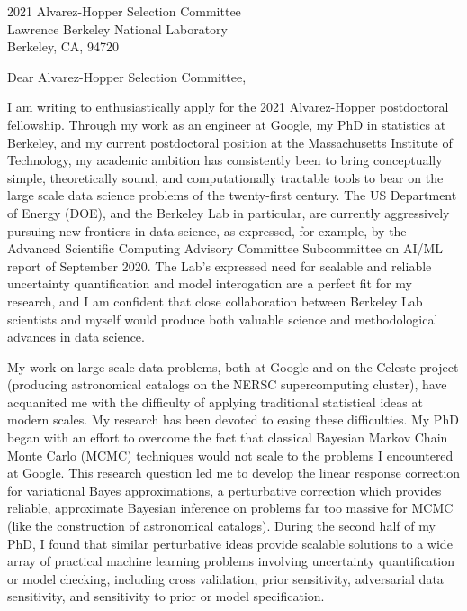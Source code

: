\documentclass{letter}
\begin{document}
\begin{letter}{2021 Alvarez-Hopper Selection Committee\\
Lawrence Berkeley National Laboratory\\
Berkeley, CA, 94720}


\opening{Dear Alvarez-Hopper Selection Committee,}

I am writing to enthusiastically apply for the 2021 Alvarez-Hopper postdoctoral
fellowship.  Through my work as an engineer at Google, my PhD in statistics at
Berkeley, and my current postdoctoral position at the Massachusetts Institute of
Technology, my academic ambition has consistently been to bring conceptually
simple, theoretically sound, and computationally tractable tools to bear on the
large scale data science problems of the twenty-first century.  The US
Department of Energy (DOE), and the Berkeley Lab in particular, are currently
aggressively pursuing new frontiers in data science, as expressed, for example,
by the Advanced Scientific Computing Advisory Committee Subcommittee on AI/ML
report of September 2020.  The Lab's expressed need for scalable and reliable
uncertainty quantification and model interogation are a perfect fit for my
research, and I am confident that close collaboration between Berkeley
Lab scientists and myself would produce both valuable science and
methodological advances in data science.

My work on large-scale data problems, both at Google and on the Celeste project
(producing astronomical catalogs on the NERSC supercomputing cluster), have
acquanited me with the difficulty of applying traditional statistical ideas at
modern scales.  My research has been devoted to easing these difficulties.
My PhD began with an effort to overcome the fact that classical Bayesian Markov
Chain Monte Carlo (MCMC) techniques would not scale to the problems I
encountered at Google. This research question led me to develop the linear
response correction for variational Bayes approximations, a perturbative
correction which provides reliable, approximate Bayesian inference on problems
far too massive for MCMC (like the construction of astronomical catalogs).
During the second half of my PhD, I found that similar perturbative ideas
provide scalable solutions to a wide array of practical machine learning
problems involving uncertainty quantification or model checking, including cross
validation, prior sensitivity, adversarial data sensitivity, and sensitivity to
prior or model specification.


\end{letter}
\end{document}
